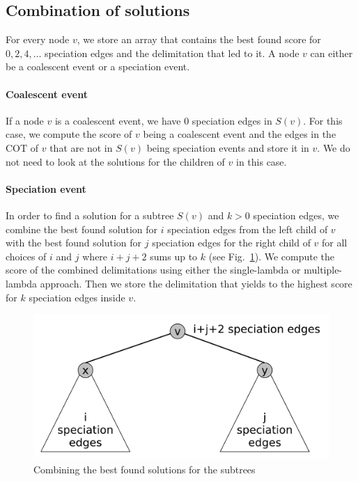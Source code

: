 \documentclass{llncs}
\begin{document}
\subsection{Combination of solutions}

For every node $v$, we store an array that contains the best found score for $0, 2, 4, \ldots$ speciation edges and the delimitation that led to it. A node $v$ can either be a coalescent event or a speciation event.

\paragraph{Coalescent event}
If a node $v$ is a coalescent event, we have $0$ speciation edges in $S(v)$. For this case, we compute the score of $v$ being a coalescent event and the edges in the COT of $v$ that are not in $S(v)$ being speciation events and store it in $v$. We do not need to look at the solutions for the children of $v$ in this case.

\paragraph{Speciation event}
In order to find a solution for a subtree $S(v)$ and $k>0$ speciation edges, we combine the best found solution for $i$ speciation edges from the left child of $v$ with the best found solution for $j$ speciation edges for the right child of $v$ for all choices of $i$ and $j$ where $i+j+2$ sums up to $k$ (see Fig.~\ref{fig:combining}). We compute the score of the combined delimitations using either the single-lambda or multiple-lambda approach. Then we store the delimitation that yields to the highest score for $k$ speciation edges inside $v$.

\begin{figure}[h!]
\centering
\includegraphics[scale=0.3]{images/speciation_events.pdf}
\caption{Combining the best found solutions for the subtrees}
\label{fig:combining}
\end{figure}
\end{document}
